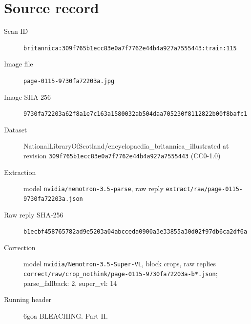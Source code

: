\documentclass{article}
\begin{document}
\section*{Source record}
\begin{description}
\item[Scan ID] \texttt{britannica:309f765b1ecc83e0a7f7762e44b4a927a7555443:train:115}
\item[Image file] \texttt{page-0115-9730fa72203a.jpg}
\item[Image SHA-256] \texttt{9730fa72203a62f8a1e7c163a1580032ab504daa705230f8112822b00f8bafc1}
\item[Dataset] NationalLibraryOfScotland/encyclopaedia\_britannica\_illustrated at revision \texttt{309f765b1ecc83e0a7f7762e44b4a927a7555443} (CC0-1.0)
\item[Extraction] model \texttt{nvidia/nemotron-3.5-parse}, raw reply \texttt{extract/raw/page-0115-9730fa72203a.json}
\item[Raw reply SHA-256] \texttt{b1ecbf458765782ad9e5203a04abcceda0900a3e33855a30d02f97db6ca2df6a}
\item[Correction] model \texttt{nvidia/Nemotron-3.5-Super-VL}, block crops, raw replies \texttt{correct/raw/crop\_nothink/page-0115-9730fa72203a-b*.json}; parse\_fallback: 2, super\_vl: 14
\item[Running header] 6goa BLEACHING. Part II.
\end{description}
\end{document}
